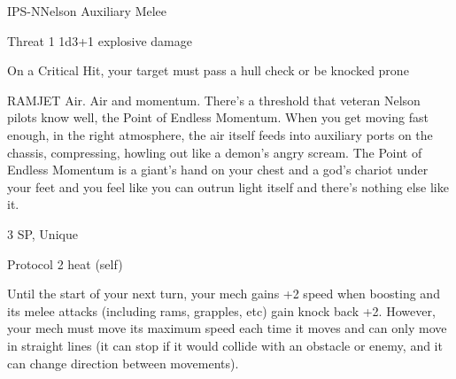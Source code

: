 \begin{mech}{IPS-N}{Nelson}
Auxiliary Melee

Threat 1
1d3+1 explosive damage

On a Critical Hit, your target must pass a hull check or be knocked prone

RAMJET
Air. Air and momentum. There’s a threshold that veteran Nelson pilots know well, the Point of Endless Momentum. When you get moving fast enough, in the right atmosphere, the air itself feeds into auxiliary ports on the chassis, compressing, howling out like a demon’s angry scream. The Point of Endless Momentum is a giant’s hand on your chest and a god’s chariot under your feet and you feel like you can outrun light itself and there’s nothing else like it.

3 SP, Unique

Protocol
2 heat (self)

Until the start of your next turn, your mech gains +2 speed when boosting and its melee attacks (including rams, grapples, etc) gain knock back +2. However, your mech must move its maximum speed each time it moves and can only move in straight lines (it can stop if it would collide with an obstacle or enemy, and it can change direction between movements).

\end{mech}
